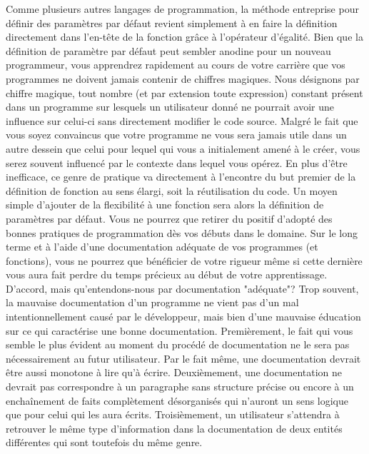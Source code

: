 \vspace{\baselineskip}
\noindent
Comme plusieurs autres langages de programmation, la méthode entreprise pour définir des paramètres par défaut revient simplement à en faire la définition directement dans l'en-tête de la fonction grâce à l'opérateur d'égalité. Bien que la définition de paramètre par défaut peut sembler anodine pour un nouveau programmeur, vous apprendrez rapidement au cours de votre carrière que vos programmes ne doivent jamais contenir de chiffres magiques. Nous désignons par chiffre magique, tout nombre (et par extension toute expression) constant présent dans un programme sur lesquels un utilisateur donné ne pourrait avoir une influence sur celui-ci sans directement modifier le code source. Malgré le fait que vous soyez convaincus que votre programme ne vous sera jamais utile dans un autre dessein que celui pour lequel qui vous a initialement amené à le créer, vous serez souvent influencé par le contexte dans lequel vous opérez. En plus d'être inefficace, ce genre de pratique va directement à l'encontre du but premier de la définition de fonction au sens élargi, soit la réutilisation du code. Un moyen simple d'ajouter de la flexibilité à une fonction sera alors la définition de paramètres par défaut. Vous ne pourrez que retirer du positif d'adopté des bonnes pratiques de programmation dès vos débuts dans le domaine. Sur le long terme et à l'aide d'une documentation adéquate de vos programmes (et fonctions), vous ne pourrez que bénéficier de votre rigueur même si cette dernière vous aura fait perdre du temps précieux au début de votre apprentissage. \\

\noindent
D'accord, mais qu'entendons-nous par documentation "adéquate"? Trop souvent, la mauvaise documentation d'un programme ne vient pas d'un mal intentionnellement causé par le développeur, mais bien d'une mauvaise éducation sur ce qui caractérise une bonne documentation. Premièrement, le fait qui vous semble le plus évident au moment du procédé de documentation ne le sera pas nécessairement au futur utilisateur.  Par le fait même, une documentation devrait être aussi monotone à lire qu'à écrire. Deuxièmement, une documentation ne devrait pas correspondre à un paragraphe sans structure précise ou encore à un enchaînement de faits complètement désorganisés qui n'auront un sens logique que pour celui qui les aura écrits. Troisièmement, un utilisateur s'attendra à retrouver le même type d'information dans la documentation de deux entités différentes qui sont toutefois du même genre. \\

